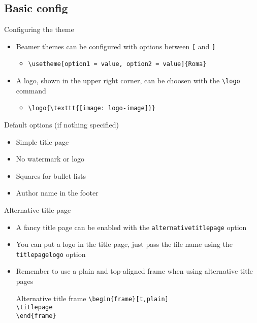 \subsection{Basic config}
\begin{frame}[t,fragile]{Configuring the theme}
\begin{itemize}
\item Beamer themes can be configured with options between \verb![! and
    \verb!]!
  \begin{itemize}
  \item \verb!\usetheme[option1 = value, option2 = value]{Roma}!
  \end{itemize}
\item A logo, shown in the upper right corner, can be choosen with the
    \verb!\logo! command
  \begin{itemize}
  \item \verb!\logo{\texttt{[image: logo-image]}}!
  \end{itemize}
\end{itemize}
\begin{alertblock}{Default options (if nothing specified)}
  \begin{itemize}
  \item Simple title page
  \item No watermark or logo
  \item Squares for bullet lists
  \item Author name in the footer
  \end{itemize}
\end{alertblock}
\end{frame}

\begin{frame}[t,fragile]{Alternative title page}
\begin{itemize}
  \item A fancy title page can be enabled with the \verb!alternativetitlepage!
      option
  \item You can put a logo in the title page, just pass the file name using the
      \verb!titlepagelogo! option
  \item Remember to use a plain and top-aligned frame when using alternative title
      pages
  \begin{exampleblock}{Alternative title frame}
      \verb!\begin{frame}[t,plain]!\\
      \verb!\titlepage!\\
      \verb!\end{frame}!
  \end{exampleblock}
\end{itemize}
\end{frame}

